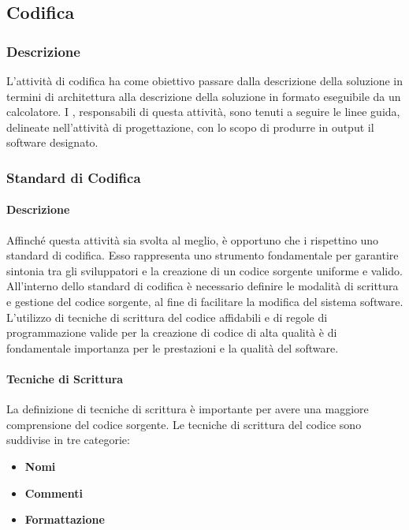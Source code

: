 \subsection{Codifica}

\subsubsection{Descrizione}
L'attività di codifica ha come obiettivo passare dalla descrizione della soluzione in termini di architettura alla descrizione della soluzione in formato eseguibile da un calcolatore. I \textit{\Progrs}, responsabili di questa attività, sono tenuti a seguire le linee guida, delineate nell'attività di progettazione, con lo scopo di produrre in output il software designato. 

\subsubsection{Standard di Codifica}
\paragraph{Descrizione}
Affinché questa attività sia svolta al meglio, è opportuno che i \textit{\Progrs} rispettino uno standard di codifica.
Esso rappresenta uno strumento fondamentale per garantire sintonia tra gli sviluppatori e la creazione di un codice sorgente uniforme e valido.
All'interno dello standard di codifica è necessario definire le modalità di scrittura e gestione del codice sorgente, al fine di facilitare la modifica del sistema software.
L'utilizzo di tecniche di scrittura del codice affidabili e di regole di programmazione valide per la creazione di codice di alta qualità è di fondamentale importanza per le prestazioni e la qualità del software. 


\paragraph{Tecniche di Scrittura}
La definizione di tecniche di scrittura è importante per avere una maggiore comprensione del codice sorgente.
Le tecniche di scrittura del codice sono suddivise in tre categorie:
\begin{itemize} 
\item
\textbf{Nomi}
\item
\textbf{Commenti}
\item
\textbf{Formattazione}
\end{itemize}

